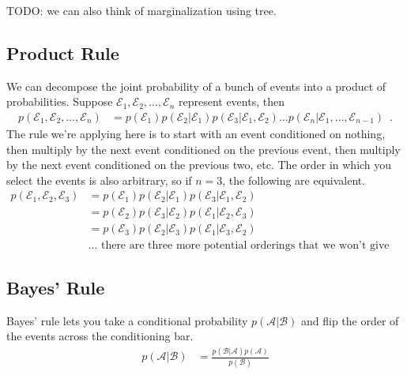 \documentclass{tufte-handout}
\begin{document}
TODO: we can also think of marginalization using tree.

\subsection{Product Rule}

We can decompose the joint probability of a bunch of events into a product of probabilities.  Suppose $\mathcal{E}_1, \mathcal{E}_2, \ldots, \mathcal{E}_n$ represent events, then
\begin{align}
p(\mathcal{E}_1, \mathcal{E}_2, \ldots, \mathcal{E}_n) &= p(\mathcal{E}_1) p(\mathcal{E}_2 | \mathcal{E}_1) p(\mathcal{E}_3 | \mathcal{E}_1, \mathcal{E}_2) \ldots p(\mathcal{E}_n | \mathcal{E}_1, \ldots, \mathcal{E}_{n-1}) \enspace .
\end{align}
The rule we're applying here is to start with an event conditioned on nothing, then multiply by the next event conditioned on the previous event, then multiply by the next event conditioned on the previous two, etc.  The order in which you select the events is also arbitrary, so if $n=3$, the following are equivalent.
\begin{align}
p(\mathcal{E}_1, \mathcal{E}_2, \mathcal{E}_3) &= p(\mathcal{E}_1) p(\mathcal{E}_2|\mathcal{E}_1)p(\mathcal{E}_3|\mathcal{E}_1, \mathcal{E}_2) \nonumber \\
&= p(\mathcal{E}_2) p(\mathcal{E}_3|\mathcal{E}_2)p(\mathcal{E}_1|\mathcal{E}_2, \mathcal{E}_3) \nonumber \\
&= p(\mathcal{E}_3) p(\mathcal{E}_2|\mathcal{E}_3)p(\mathcal{E}_1|\mathcal{E}_3, \mathcal{E}_2) \nonumber \\
&\mbox{... there are three more potential orderings that we won't give explicitly} \nonumber
\end{align}

\subsection{Bayes' Rule}

Bayes' rule lets you take a conditional probability $p(\mathcal{A}|\mathcal{B})$ and flip the order of the events across the conditioning bar.
\begin{align}
p(\mathcal{A}|\mathcal{B}) &= \frac{p(\mathcal{B}|\mathcal{A}) p(\mathcal{A})}{p(\mathcal{B})}
\end{align}
\end{document}
